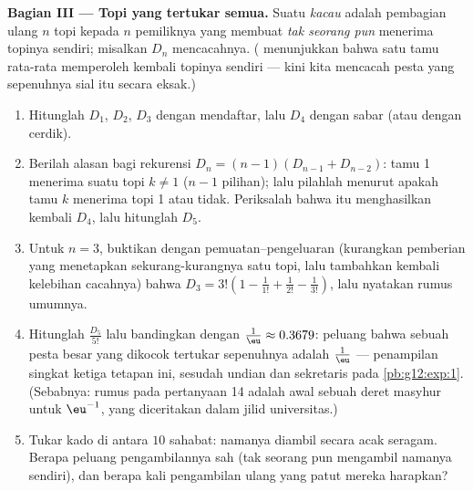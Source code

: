 \begin{problem}
\medskip
\noindent\textbf{Bagian III --- Topi yang tertukar semua.}
Suatu \emph{ kacau} adalah pembagian ulang $n$ topi kepada
$n$ pemiliknya yang membuat \emph{tak seorang pun} menerima topinya sendiri;
misalkan $D_n$ mencacahnya. ( menunjukkan bahwa satu tamu
rata-rata memperoleh kembali topinya sendiri --- kini kita mencacah pesta yang
sepenuhnya sial itu secara eksak.)
\begin{enumerate}[resume]
  \item Hitunglah $D_1$, $D_2$, $D_3$ dengan mendaftar, lalu $D_4$
        dengan sabar (atau dengan cerdik).
  \item Berilah alasan bagi rekurensi
        $D_n = (n - 1)\left(D_{n-1} + D_{n-2}\right)$: tamu 1
        menerima suatu topi $k \neq 1$ ($n - 1$ pilihan); lalu pilahlah
        menurut apakah tamu $k$ menerima topi 1 atau tidak.
        Periksalah bahwa itu menghasilkan kembali $D_4$, lalu hitunglah $D_5$.
  \item Untuk $n = 3$, buktikan dengan pemuatan--pengeluaran (kurangkan
        pemberian yang menetapkan sekurang-kurangnya satu topi, lalu tambahkan
        kembali kelebihan cacahnya) bahwa
        $D_3 = 3!\left(1 - \frac{1}{1!} + \frac{1}{2!} -
        \frac{1}{3!}\right)$, lalu nyatakan rumus umumnya.
  \item Hitunglah $\frac{D_5}{5!}$ lalu bandingkan dengan
        $\frac1\eu \approx 0.3679$: peluang bahwa sebuah
        pesta besar yang dikocok tertukar sepenuhnya adalah
        $\frac1\eu$ --- penampilan singkat ketiga tetapan ini, sesudah
        undian dan sekretaris pada \cref{pb:g12:exp:1}.
        (Sebabnya: rumus pada pertanyaan 14 adalah awal sebuah
        deret masyhur untuk $\eu^{-1}$, yang diceritakan dalam jilid
        universitas.)
  \item Tukar kado di antara $10$ sahabat: namanya diambil
        secara acak seragam. Berapa peluang pengambilannya
        sah (tak seorang pun mengambil namanya sendiri), dan berapa kali
        pengambilan ulang yang patut mereka harapkan?
\end{enumerate}


\end{problem}
